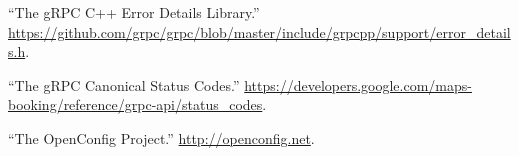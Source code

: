 \documentclass[11pt]{article}
\begin{document}
{{\begin{thebibliography}{45}
\mdbibitemlabel{{}[39]}\textquotedblleft{}The gRPC C++ Error Details Library.\textquotedblright{} \href{https://github.com/grpc/grpc/blob/master/include/grpcpp/support/error_details.h}{{\ttfamily https://\hspace{0pt}github.\hspace{0pt}com/\hspace{0pt}grpc/\hspace{0pt}grpc/\hspace{0pt}blob/\hspace{0pt}master/\hspace{0pt}include/\hspace{0pt}grpcpp/\hspace{0pt}support/\hspace{0pt}error\_\hspace{0pt}details.\hspace{0pt}h}}.\label{grpcerrordetails}%

\mdbibitemlabel{{}[40]}\textquotedblleft{}The gRPC Canonical Status Codes.\textquotedblright{} \href{https://developers.google.com/maps-booking/reference/grpc-api/status_codes}{{\ttfamily https://\hspace{0pt}developers.\hspace{0pt}google.\hspace{0pt}com/\hspace{0pt}maps-\hspace{0pt}booking/\hspace{0pt}reference/\hspace{0pt}grpc-\hspace{0pt}api/\hspace{0pt}status\_\hspace{0pt}codes}}.\label{grpcstatuscodes}%

\mdbibitemlabel{{}[41]}\textquotedblleft{}The OpenConfig Project.\textquotedblright{} \href{http://openconfig.net}{{\ttfamily http://\hspace{0pt}openconfig.\hspace{0pt}net}}.\label{openconfig}%


\end{thebibliography}}}
\end{document}
